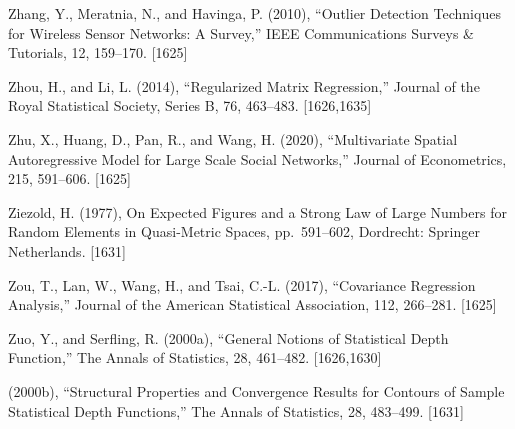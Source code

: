 \documentclass[
  10
]{article}
\begin{document}
Zhang, Y., Meratnia, N., and Havinga, P. (2010), ``Outlier Detection
Techniques for Wireless Sensor Networks: A Survey,'' IEEE Communications
Surveys \& Tutorials, 12, 159--170. {[}1625{]}

Zhou, H., and Li, L. (2014), ``Regularized Matrix Regression,'' Journal
of the Royal Statistical Society, Series B, 76, 463--483.
{[}1626,1635{]}

Zhu, X., Huang, D., Pan, R., and Wang, H. (2020), ``Multivariate Spatial
Autoregressive Model for Large Scale Social Networks,'' Journal of
Econometrics, 215, 591--606. {[}1625{]}

Ziezold, H. (1977), On Expected Figures and a Strong Law of Large
Numbers for Random Elements in Quasi-Metric Spaces, pp.~591--602,
Dordrecht: Springer Netherlands. {[}1631{]}

Zou, T., Lan, W., Wang, H., and Tsai, C.-L. (2017), ``Covariance
Regression Analysis,'' Journal of the American Statistical Association,
112, 266--281. {[}1625{]}

Zuo, Y., and Serfling, R. (2000a), ``General Notions of Statistical
Depth Function,'' The Annals of Statistics, 28, 461--482.
{[}1626,1630{]}

(2000b), ``Structural Properties and Convergence Results for Contours of
Sample Statistical Depth Functions,'' The Annals of Statistics, 28,
483--499. {[}1631{]}
\end{document}
